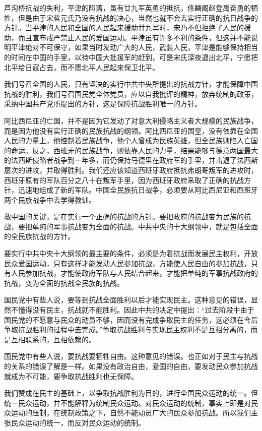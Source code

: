 芦沟桥抗战的失利，平津的陷落，虽有廿九军英勇的抵抗，佟麟阁赵登禹奋勇的牺牲，但是由于宋哲元氏乃没有抗战的决心，当然也就不会去实行正确的抗日战争的方针。当平津的人民和全国的人民起来援助廿九军时，宋乃不但拒绝了人民的援助，而且宣布戒严禁止人民的爱国运动。平津虽有许多不利的条件，但这并不能说明平津绝对不可保守，如果当时发动广大的人民，武装人民，平津是能够保持相当的时间在中国的手里，以待中国大批援军的赶到，可是宋氏深夜退出北平，宁愿把北平给日寇占去，而不愿北平人民起来保卫北平。

我们号召全国的人民，只有坚决的实行中共中央所提出的抗战方针，才能保障中国抗战的胜利，我们号召国民党全体党员，应以自我批评的精神，放弃统制的政策，采纳中国共产党所提出的方针，这是保障抗战胜利唯一的方针。

阿比西尼亚的亡国，并不是因为它发动了对意大利侵略主义者大规模的民族战争，而是因为他没有实行正确的民族抗战的纲领。阿比西尼亚的国皇，没有依靠在全国人民的力量上，他控制着民族战争，他个人曾成为民族英雄，但全民族则陷入亡国的命运。反之，西班牙的民族战争，则依靠人民的力量，结果能够与德意两国最大的法西斯侵略者战争到一年多，而仍保持马德里在政府军的手里，并击退了法西斯屡次的进攻，并取得胜利。我们还应该知道西班牙政府抵抗弗朗哥叛军的进攻时，西班牙原有的军队百分之八十在叛军手里，因为西班牙政府釆取了正确的抗战方针，迅速地组成了新的军队。中国全民族抗日战争，必须要从阿比西尼亚和西班牙两个民族战争中去学得教训。

救中国的关键，是在实行一个正确的抗战的方针。要把政府的抗战变为民族的抗战，要把单纯的军事抗战变为全面的抗战。中共中央的十大纲领中，就是包括全面的全民族抗战的方针。

要实行中共中央十大纲领的最主要的条件，必须是为着抗战而发展民主权利，开放民众爱国运动，只有这样才能发动人民参加抗战，方能使人民自由的参加抗战，只有人民参加抗战，才能使政府军队与人民结合起来，才能把单纯的军事抗战政府的抗战，变为全面的抗战全民族的抗战。

国民党中有些人说，要等到抗战全面胜利以后才能实现民主。这种意见的错误，显然不懂得没有民主，抗战就不能胜利。因此中共的决定中提出：“过去阶段中由于国民党的不愿意与民众的动员不够，因而没有完成争取民主的任务，这必须在今后争取抗战胜利的过程中去完成。”争取抗战胜利与实现民主权利不是互相分离的，而是互相联系的，互相依赖的。

国民党中有些人说，要抗战要牺牲自由。这种意见的错误。也正如对于民主与抗战的关系的错误了解是一样。如果没有政治自由，爱国的自由，要发动民众参加抗战就成为不可能，要争取抗战胜利也无保障。

我们赞成在民主的基础上，以争取抗战胜利为目的，进行全国民众运动的统一。但统一民众运动，并不能解释为统制民众运动。对民众运动的统制，事实上即是对民众运动的压制，在统制政策之下，自然不能动员广大的民众参加抗战。所以我们主张民众运动的统一，而反对民众运动的统制。


